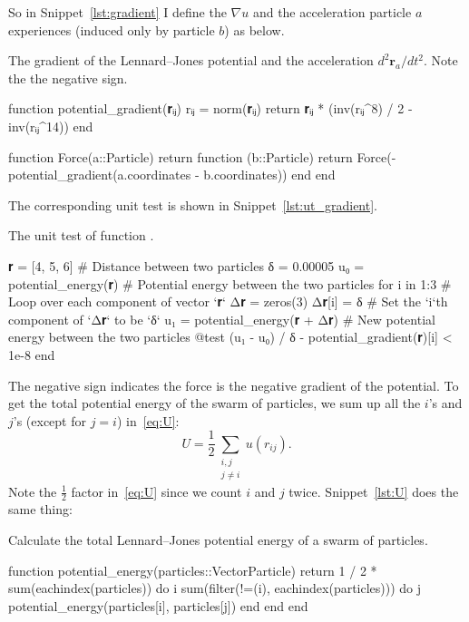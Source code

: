 %
So in Snippet~\ref{lst:gradient} I define the \(\nabla u\) and the acceleration
particle \(a\) experiences (induced only by particle \(b\)) as below.
%
\begin{algorithm}
    \caption{The gradient of the Lennard--Jones potential and the acceleration
        \(d^2 \bm{r}_a / d t^2\). Note the the negative sign.}
    \label{lst:gradient}
    \begin{juliacode}
        function potential_gradient(𝐫ᵢⱼ)
            rᵢⱼ = norm(𝐫ᵢⱼ)
            return 𝐫ᵢⱼ * (inv(rᵢⱼ^8) / 2 - inv(rᵢⱼ^14))
        end

        function Force(a::Particle)
            return function (b::Particle)
                return Force(-potential_gradient(a.coordinates - b.coordinates))
            end
        end
    \end{juliacode}
\end{algorithm}
%
The corresponding unit test is shown in Snippet~\ref{lst:ut_gradient}.
%
\begin{algorithm}[H]
    \caption{The unit test of function .}
    \label{lst:ut_gradient}
    \begin{juliacode}
        𝐫 = [4, 5, 6]  # Distance between two particles
        δ = 0.00005
        u₀ = potential_energy(𝐫)  # Potential energy between the two particles
        for i in 1:3  # Loop over each component of vector `𝐫`
            Δ𝐫 = zeros(3)
            Δ𝐫[i] = δ  # Set the `i`th component of `Δ𝐫` to be `δ`
            u₁ = potential_energy(𝐫 + Δ𝐫)  # New potential energy between the two particles
            @test (u₁ - u₀) / δ - potential_gradient(𝐫)[i] < 1e-8
        end
    \end{juliacode}
\end{algorithm}
%
The negative sign indicates the force is the negative gradient of the potential.
To get the total potential energy of the swarm of particles, we sum up all the \(i\)'s
and \(j\)'s (except for \(j = i\)) in~\eqref{eq:U}:
%
\begin{equation}\label{eq:U}
    U = \frac{ 1 }{ 2 }\sum_{\substack{i, j\\ j \neq i}} u(r_{ij}).
\end{equation}
%
Note the \(\frac{ 1 }{ 2 }\) factor in~\eqref{eq:U} since we count \(i\) and \(j\) twice.
Snippet~\ref{lst:U} does the same thing:

\begin{algorithm}[H]
    \caption{Calculate the total Lennard--Jones potential energy of a swarm of particles.}
    \label{lst:U}
    \begin{juliacode}
        function potential_energy(particles::Vector{Particle})
            return 1 / 2 * sum(eachindex(particles)) do i
                sum(filter(!=(i), eachindex(particles))) do j
                    potential_energy(particles[i], particles[j])
                end
            end
        end
    \end{juliacode}
\end{algorithm}

